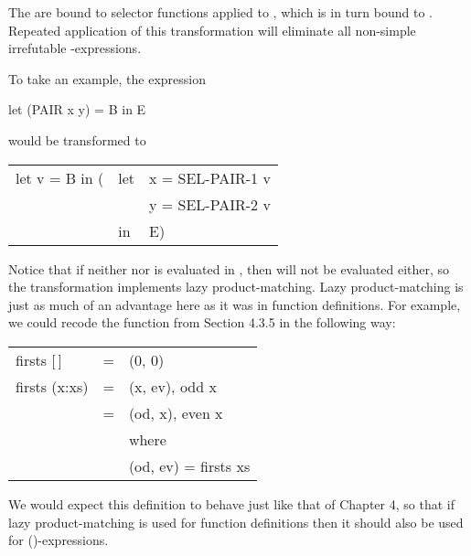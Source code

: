 {

The  are bound to selector functions applied to , which is in turn bound to
. Repeated application of this transformation will eliminate all non-simple
irrefutable -expressions.

To take an example, the expression
\begin{mlcoded}
	let (PAIR x y) = B in E
\end{mlcoded}
would be transformed to
\begin{mlcoded}
	\begin{tabular}{lll}
	let v = B in (&let &x = SEL-PAIR-1 v \\
		& &y = SEL-PAIR-2 v\\
		&in &E)
	\end{tabular}
\end{mlcoded}

Notice that if neither  nor  is evaluated in , then  will not be evaluated
either, so the transformation implements lazy product-matching. Lazy
product-matching is just as much of an advantage here as it was in function
definitions. For example, we could recode the function  from Section
4.3.5 in the following way:
\begin{mlcoded}
	\begin{tabular}{lll}
	firsts [\,] &= &(0, 0)\\
	firsts (x:xs) &= &(x, ev), \qquad odd x\\
	&= &(od, x), \qquad even x\\
	& &where\\
	& &(od, ev) = firsts xs
	\end{tabular}
\end{mlcoded}
We would expect this definition to behave just like that of Chapter 4, so that if
lazy product-matching is used for function definitions then it should also be
used for ()-expressions.

}
